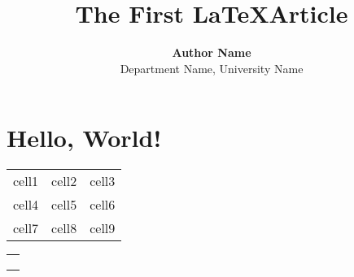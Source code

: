 \documentclass{article}
\title{\textbf{The First  \LaTeX  Article}}
\author{\textbf{Author Name} \\ Department Name, University Name}
\begin{document}
    \maketitle %
    \begin{abstract} %
        \lipsum[1] %
    \end{abstract} %
    \section{Hello, World!} %
    \lipsum[2-4] %

    \begin{tabular}{ c c c } %
        cell1 & cell2 & cell3 \\ 
        cell4 & cell5 & cell6 \\ 
        cell7 & cell8 & cell9 \\ 
    \end{tabular}
    
    \begin{tabular}{|p{}|}
        \hline \\
        {

        }
        \\\\\hline
    \end{tabular}
\end{document}
